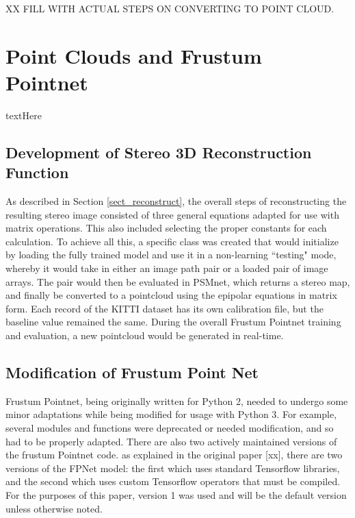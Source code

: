 XX FILL WITH ACTUAL STEPS ON CONVERTING TO POINT CLOUD.

\newpage
\section{Point Clouds and Frustum Pointnet} %
textHere





\subsection{Development of Stereo 3D Reconstruction Function}
As described in Section \ref{sect_reconstruct}, the overall steps of reconstructing the resulting stereo image consisted of three general equations adapted for use with matrix operations. This also included selecting the proper constants for each calculation. To achieve all this, a specific class was created that would initialize by loading the fully trained model and use it in a non-learning ``testing" mode, whereby it would take in either an image path pair or a loaded pair of image arrays. The pair would then be evaluated in PSMnet, which returns a stereo map, and finally be converted to a pointcloud using the epipolar equations in matrix form. Each record of the KITTI dataset has its own calibration file, but the baseline value remained the same. During the overall Frustum Pointnet training and evaluation, a new pointcloud would be generated in real-time.

\subsection{Modification of Frustum Point Net}
Frustum Pointnet, being originally written for Python 2, needed to undergo some minor adaptations while being modified for usage with Python 3. For example, several modules and functions were deprecated or needed modification, and so had to be properly adapted. There are also two actively maintained versions of the frustum Pointnet code. as explained in the original paper [xx], there are two versions of the FPNet model: the first which uses standard Tensorflow libraries, and the second which uses custom Tensorflow operators that must be compiled. For the purposes of this paper, version 1 was used and will be the default version unless otherwise noted.

